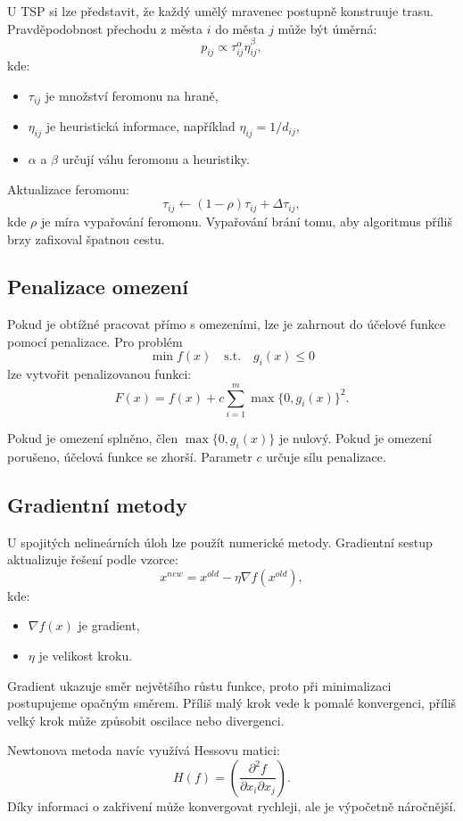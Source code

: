 U TSP si lze představit, že každý umělý mravenec postupně konstruuje trasu. Pravděpodobnost přechodu
z města $i$ do města $j$ může být úměrná:
\[
p_{ij}\propto \tau_{ij}^{\alpha}\eta_{ij}^{\beta},
\]
kde:
\begin{itemize}
    \item $\tau_{ij}$ je množství feromonu na hraně,
    \item $\eta_{ij}$ je heuristická informace, například $\eta_{ij}=1/d_{ij}$,
    \item $\alpha$ a $\beta$ určují váhu feromonu a heuristiky.
\end{itemize}

Aktualizace feromonu:
\[
\tau_{ij}\leftarrow (1-\rho)\tau_{ij}+\Delta\tau_{ij},
\]
kde $\rho$ je míra vypařování feromonu. Vypařování brání tomu, aby algoritmus příliš brzy zafixoval
špatnou cestu.

\subsection{Penalizace omezení}

Pokud je obtížné pracovat přímo s omezeními, lze je zahrnout do účelové funkce pomocí penalizace.
Pro problém
\[
\min f(x)
\quad \text{s.t.}\quad
g_i(x)\le 0
\]
lze vytvořit penalizovanou funkci:
\[
F(x)=f(x)+c\sum_{i=1}^m \max\{0,g_i(x)\}^2.
\]

Pokud je omezení splněno, člen $\max\{0,g_i(x)\}$ je nulový. Pokud je omezení porušeno, účelová
funkce se zhorší. Parametr $c$ určuje sílu penalizace.

\subsection{Gradientní metody}

U spojitých nelineárních úloh lze použít numerické metody. Gradientní sestup aktualizuje řešení podle
vzorce:
\[
x^{new}=x^{old}-\eta\nabla f(x^{old}),
\]
kde:
\begin{itemize}
    \item $\nabla f(x)$ je gradient,
    \item $\eta$ je velikost kroku.
\end{itemize}

Gradient ukazuje směr největšího růstu funkce, proto při minimalizaci postupujeme opačným směrem.
Příliš malý krok vede k pomalé konvergenci, příliš velký krok může způsobit oscilace nebo divergenci.

Newtonova metoda navíc využívá Hessovu matici:
\[
H(f)=
\left(
\frac{\partial^2 f}{\partial x_i\partial x_j}
\right).
\]
Díky informaci o zakřivení může konvergovat rychleji, ale je výpočetně náročnější.


